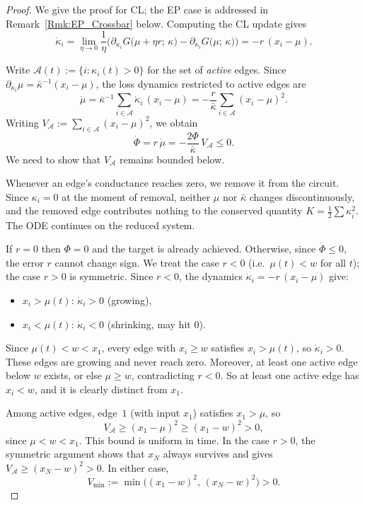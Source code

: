 \documentclass[final, 11pt, nonatbib]{elsarticle}
\theoremstyle{definition}
\theoremstyle{plain}
\numberwithin{equation}{section}
\begin{document}
  \begin{proof}

  We give the proof for CL; the EP case is addressed in Remark~\ref{Rmk:EP_Crossbar} below. Computing the CL update gives
\[
\dot{\kappa}_i
= \lim_{\eta \to 0}
  \dfrac{1}{\eta}\Big(\partial_{\kappa_i}G\big(\mu + \eta r;\, \kappa\big)
  - \partial_{\kappa_i}G\big(\mu;\, \kappa\big)\Big)
= -r\,(x_i - \mu).
\]

Write $\mathcal{A}(t) := \{i : \kappa_i(t) > 0\}$ for the set of
\emph{active} edges.  Since
$\partial_{\kappa_i}\mu = \bar{\kappa}^{-1}(x_i - \mu)$, the loss dynamics
restricted to active edges are
\[
\dot{\mu}
= \bar{\kappa}^{-1}\sum_{i \in \mathcal{A}} \dot{\kappa}_i\,(x_i - \mu)
= -\dfrac{r}{\bar{\kappa}} \sum_{i \in \mathcal{A}} (x_i - \mu)^2.
\]
Writing $V_{\mathcal{A}} := \sum_{i \in \mathcal{A}} (x_i - \mu)^2$, we obtain
\begin{equation}\label{eq:crossbar_loss}
\dot{\Phi} = r\,\dot{\mu} = -\dfrac{2\Phi}{\bar{\kappa}}\, V_{\mathcal{A}}
\leq 0.
\end{equation}
We need to show that $V_{\mathcal{A}}$ remains bounded below.

Whenever an edge's conductance reaches zero, we remove it from the circuit.
Since $\kappa_i = 0$ at the moment of removal, neither $\mu$ nor $\bar{\kappa}$
changes discontinuously, and the removed edge contributes nothing to the
conserved quantity $K = \frac{1}{2}\sum \kappa_i^2$.
The ODE continues on the reduced system.

If $r = 0$ then $\Phi = 0$ and the target is already achieved.
Otherwise, since $\dot{\Phi} \leq 0$, the error $r$ cannot change sign.
We treat the case $r < 0$ (i.e.\ $\mu(t) < w$ for all $t$);
the case $r > 0$ is symmetric. Since $r < 0$, the dynamics $\dot{\kappa}_i = -r\,(x_i - \mu)$ give:
\begin{itemize}
\item $x_i > \mu(t)$:\; $\dot{\kappa}_i > 0$ (growing),
\item $x_i < \mu(t)$:\; $\dot{\kappa}_i < 0$ (shrinking, may hit $0$).
\end{itemize}

Since $\mu(t) < w < x_1$, every edge with $x_i \geq w$ satisfies
$x_i > \mu(t)$, so $\dot{\kappa}_i > 0$.
These edges are growing and never reach zero. Moreover, at least one active edge below $w$ exists, or else $\mu \geq w$, contradicting $r < 0$.
So at least one active edge has $x_i < w$, and it is clearly distinct
from $x_1$.

Among active edges, edge~$1$ (with input $x_1$) satisfies $x_1 > \mu$, so
\[
V_{\mathcal{A}} \geq (x_1 - \mu)^2 \geq (x_1 - w)^2 > 0,
\]
since $\mu < w < x_1$.  This bound is uniform in time.
In the case $r > 0$, the symmetric argument shows that $x_N$ always
survives and gives $V_{\mathcal{A}} \geq (x_N - w)^2 > 0$.  In either case,
\[
V_{\min} := \min\!\big((x_1 - w)^2,\, (x_N - w)^2\big) > 0.
\]


\end{proof}
\end{document}
